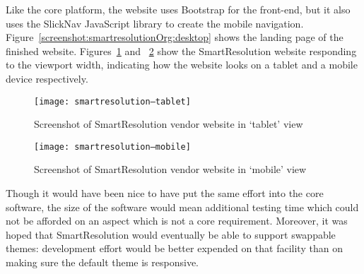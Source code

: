 Like the core platform, the website uses Bootstrap for the front-end, but it also uses the SlickNav JavaScript library to create the mobile navigation. Figure~\ref{screenshot:smartresolutionOrg:desktop} shows the landing page of the finished website. Figures~\ref{screenshot:smartresolutionOrg:tablet} and ~\ref{screenshot:smartresolutionOrg:mobile} show the SmartResolution website responding to the viewport width, indicating how the website looks on a tablet and a mobile device respectively.

\begin{figure}[h!]
  \centering
    \ifimages
    \texttt{[image: smartresolution--tablet]}
    \fi
  \caption{Screenshot of SmartResolution vendor website in `tablet' view}
  \label{screenshot:smartresolutionOrg:tablet}
\end{figure}

\begin{figure}[h!]
  \centering
    \ifimages
    \texttt{[image: smartresolution--mobile]}
    \fi
  \caption{Screenshot of SmartResolution vendor website in `mobile' view}
  \label{screenshot:smartresolutionOrg:mobile}
\end{figure}

Though it would have been nice to have put the same effort into the core software, the size of the software would mean additional testing time which could not be afforded on an aspect which is not a core requirement. Moreover, it was hoped that SmartResolution would eventually be able to support swappable themes: development effort would be better expended on that facility than on making sure the default theme is responsive.